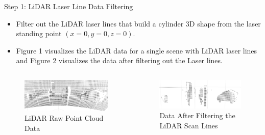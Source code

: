 \documentclass[9pt]{beamer}
\begin{document}
\begin{frame}[fragile]{Step 1: LiDAR Laser Line Data Filtering}
	\begin{itemize}
		\item Filter out the LiDAR laser lines that build
		a cylinder 3D shape from the laser standing point $(x=0, y=0, z=0)$.
		\item Figure 1 visualizes the LiDAR data for a single scene with LiDAR laser lines and Figure 2 visualizes the data after
		filtering out the Laser lines.
	\end{itemize}
	\redb{}
	
	\begin{columns}
		\begin{column}{0.48\textwidth}
			\begin{figure}
				\centering
				\includegraphics[width=\textwidth]{images/ground_before2.png}
				\caption{LiDAR Raw Point Cloud Data}			
			\end{figure}
		\end{column}
		\begin{column}{0.48\textwidth}
			\begin{figure}
				\centering
				\includegraphics[width=\textwidth]{images/ground_after2.png}		\caption{Data After Filtering the LiDAR Scan Lines}		
			\end{figure}
		\end{column}
	\end{columns}

\end{frame}

\end{document}
